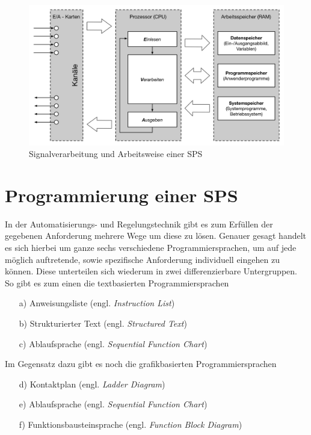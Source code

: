 	\begin{figure}[h!]
  		\centering
    	\includegraphics[width=1\textwidth]{graphics/stateoftheart/Signalverarbeitung_Selfmade.png}
  		\caption{Signalverarbeitung und Arbeitsweise einer SPS \cite{mseitz_sps}}
	\end{figure}
		
	\section{Programmierung einer SPS}

	In der Automatisierungs- und Regelungstechnik gibt es zum Erfüllen der gegebenen Anforderung mehrere Wege um diese zu lösen. Genauer gesagt handelt es sich hierbei um ganze sechs verschiedene Programmiersprachen, um auf jede möglich auftretende, sowie spezifische Anforderung individuell eingehen zu können. Diese unterteilen sich wiederum in zwei differenzierbare Untergruppen. So gibt es zum einen die textbasierten Programmiersprachen
	
	\begin{itemize}
		\item[a)] Anweisungsliste (engl. \textit{Instruction List})
		\item[b)] Strukturierter Text (engl. \textit{Structured Text})
		\item[c)] Ablaufsprache (engl. \textit{Sequential Function Chart})
	\end{itemize}

	Im Gegensatz dazu gibt es noch die grafikbasierten Programmiersprachen
	
	\begin{itemize}
		\item[d)] Kontaktplan (engl. \textit{Ladder Diagram})
		\item[e)] Ablaufsprache (engl. \textit{Sequential Function Chart})
		\item[f)] Funktionsbausteinsprache (engl. \textit{Function Block Diagram})
	\end{itemize}
	
